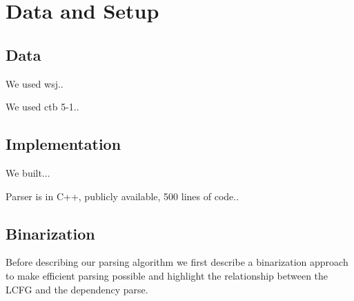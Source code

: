 \documentclass[11pt,letterpaper]{article}
\begin{document}
















\section{Data and Setup}


\subsection{Data}

We used wsj..

We used ctb 5-1..




\subsection{Implementation}

We built...

Parser is in C++, publicly available, 500 lines of code..


\subsection{Binarization}

Before describing our parsing algorithm we first describe a binarization approach to make efficient parsing possible and highlight the relationship between the LCFG and the dependency parse.

\end{document}
